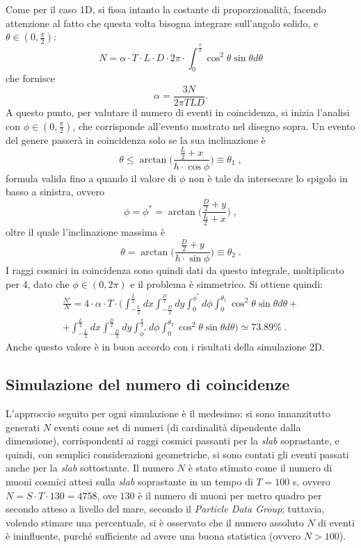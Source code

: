 Come per il caso 1D, si fissa intanto la costante di proporzionalità, facendo attenzione al fatto che questa volta bisogna integrare sull'angolo solido, e $\theta\in(0,\frac{\pi}{2})$: 
$$N = \alpha \cdot T \cdot L \cdot D \cdot 2\pi \cdot \int_{0}^{\frac{\pi}{2}} \cos^2\theta  \sin\theta d\theta$$
che fornisce 
$$\alpha = \frac{3N}{2\pi TLD}.$$ 
A questo punto, per valutare il numero di eventi in coincidenza, si inizia l'analisi con $\phi\in(0, \frac{\pi}{2})$, che corrisponde all'evento mostrato nel disegno sopra. Un evento del genere passerà in coincidenza solo se la sua inclinazione è $$\theta \leq \arctan \bigg(\frac{\frac{L}{2}+x}{h\cdot \cos\phi}\bigg) \equiv \theta_1\;,$$ formula valida fino a quando il valore di $\phi$ non è tale da intersecare lo spigolo in basso a sinistra, ovvero $$\phi = \phi^{*} = \arctan \bigg(\frac{\frac{D}{2}+y}{\frac{L}{2}+x}\bigg)\;,$$ oltre il quale l'inclinazione massima è $$\theta = \arctan \bigg(\frac{\frac{D}{2}+y}{h\cdot \sin\phi}\bigg)  \equiv \theta_2\;.$$I raggi cosmici in coincidenza sono quindi dati da questo integrale, moltiplicato per 4, dato che $\phi\in(0, 2\pi)$ e il problema è simmetrico. Si ottiene quindi:
\begin{multline*}
\frac{N'}{N}=4\cdot \alpha \cdot T\cdot \bigg( \int_{-\frac{L}{2}}^{\frac{L}{2}} dx \int_{-\frac{D}{2}}^{\frac{D}{2}} dy \int_0^{\phi^{*}} d\phi \int_0^{\theta_1} \cos^2\theta \sin\theta d\theta +\\
+ \int_{-\frac{L}{2}}^{\frac{L}{2}} dx \int_{-\frac{D}{2}}^{\frac{D}{2}} dy \int_{\phi^{*}}^{\frac{\pi}{2}} d\phi \int_0^{\theta_2} \cos^2\theta \sin\theta d\theta\bigg)\simeq 73.89 \%\;.
\end{multline*} 
Anche questo valore è in buon accordo con i risultati della simulazione 2D.

\subsection{Simulazione del numero di coincidenze}
L'approccio seguito per ogni simulazione è il medesimo: si sono innanzitutto generati $N$ eventi come set di numeri (di cardinalità dipendente dalla dimensione), corrispondenti ai raggi cosmici passanti per la \emph{slab} soprastante, e quindi, con semplici considerazioni geometriche, si sono contati gli eventi passati anche per la \emph{slab} sottostante. Il numero $N$ è stato stimato come il numero di muoni cosmici attesi sulla \emph{slab} soprastante in un tempo di $T=100$ s, ovvero $N=S\cdot T\cdot 130=4758$, ove $130$ è il numero di muoni per metro quadro per secondo atteso a livello del mare, secondo il \emph{Particle Data Group}; tuttavia, volendo stimare una percentuale, si è osservato che il numero assoluto $N$ di eventi è ininfluente, purché sufficiente ad avere una buona statistica (ovvero $N>100$).

